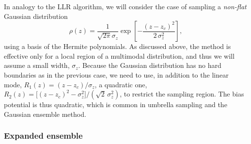 \documentclass[reprint, superscriptaddress, floatfix]{revtex4-1}
\begin{document}
In analogy to the LLR algorithm,
we will consider the case of sampling
a \emph{non-flat} Gaussian distribution
\begin{equation}
  \rho(z)
  =
  \frac{1}{\sqrt{2\pi} \sigma_z}
  \exp\left[ - \frac{(z-z_c)^2}{2\,\sigma_z^2} \right]
  ,
  \label{eq:rho_Gaussian}
\end{equation}
using a basis of the Hermite polynomials\cite{arfken}.
%
As discussed above,
the method is effective only for
a local region of a multimodal distribution,
and thus we will assume a small width, $\sigma_z$.
%
Because the Gaussian distribution has no hard boundaries
as in the previous case,
we need to use,
in addition to the linear mode,
$R_1(z) = (z - z_c)/\sigma_z$,
a quadratic one,
$R_2(z) = \bigl[(z - z_c)^2 - \sigma_z^2\bigr] /\left(\sqrt 2 \, \sigma_z^2\right)$,
to restrict the sampling region.
%
The bias potential is thus quadratic,
which is common in umbrella sampling\cite{maragliano2006, *abrams2008, zhu2012}
and the Gaussian ensemble method\cite{hetherington1987,
*challa1988, *costeniuc2006, neuhaus2006, *neuhaus2007}.



\subsubsection{\label{sec:st}
Expanded ensemble}
\end{document}

